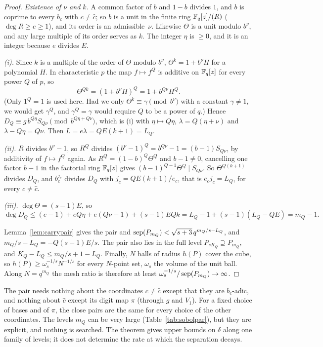 \begin{proof}
\emph{Existence of $\nu$ and $k$.} A common factor of $b$ and $1-b$ divides $1$, and $b$ is coprime to every $b_c$ with $c\ne\hat c$; so $b$ is a unit in the finite ring $\mathbb{F}_q[z]/(R)$ ($\deg R\ge e\ge1$), and its order is an admissible~$\nu$. Likewise $\Theta$ is a unit modulo $b^\nu$, and any large multiple of its order serves as $k$. The integer $\eta$ is $\ge0$, and it is an integer because $e$ divides $E$.

\emph{(i).} Since $k$ is a multiple of the order of $\Theta$ modulo $b^\nu$, $\Theta^k=1+b^\nu H$ for a polynomial $H$. In characteristic $p$ the map $f\mapsto f^Q$ is additive on $\mathbb{F}_q[z]$ for every power $Q$ of $p$, so
\[
\Theta^{Qk}=(1+b^\nu H)^Q=1+b^{Q\nu}H^Q .
\]
(Only $1^Q=1$ is used here. Had we only $\Theta^k\equiv\gamma\pmod{b^\nu}$ with a constant $\gamma\ne1$, we would get $\gamma^Q$, and $\gamma^Q=\gamma$ would require $Q$ to be a power of $q$.) Hence $D_Q\equiv g\,b^{Q\eta}S_{Q\nu}\pmod{b^{Q\eta+Q\nu}}$, which is (i) with $\eta\mapsto Q\eta$, $\lambda=Q(\eta+\nu)$ and $\lambda-Q\eta=Q\nu$. Then $L=e\lambda=QE(k+1)=L_Q$.

\emph{(ii).} $R$ divides $b^\nu-1$, so $R^Q$ divides $(b^\nu-1)^Q=b^{Q\nu}-1=(b-1)S_{Q\nu}$, by additivity of $f\mapsto f^Q$ again. As $R^Q=(1-b)^Q\Theta^Q$ and $b-1\ne0$, cancelling one factor $b-1$ in the factorial ring $\mathbb{F}_q[z]$ gives $(b-1)^{Q-1}\Theta^Q\mid S_{Q\nu}$. So $\Theta^{Q(k+1)}$ divides $D_Q$, and $b_c^{j_c}$ divides $D_Q$ with $j_c=QE(k+1)/e_c$, that is $e_cj_c=L_Q$, for every $c\ne\hat c$.

\emph{(iii).} $\deg\Theta=(s-1)E$, so
\[
\deg D_Q\le(e-1)+eQ\eta+e(Q\nu-1)+(s-1)EQk=L_Q-1+(s-1)(L_Q-QE)=m_Q-1 .
\]

Lemma~\ref{lem:carrypair} gives the pair and $\operatorname{sep}(P_{m_Q})<\sqrt{s+3}\,q^{m_Q/s-L_Q}$, and $m_Q/s-L_Q=-Q(s-1)E/s$. The pair also lies in the full level $P_{sK_Q}\supseteq P_{m_Q}$, and $K_Q-L_Q\le m_Q/s+1-L_Q$. Finally, $N$ balls of radius $h(P)$ cover the cube, so $h(P)\ge\omega_s^{-1/s}N^{-1/s}$ for every $N$-point set, $\omega_s$ the volume of the unit ball. Along $N=q^{m_Q}$ the mesh ratio is therefore at least $\omega_s^{-1/s}/\operatorname{sep}(P_{m_Q})\to\infty$.
\end{proof}

The pair needs nothing about the coordinates $c\ne\hat c$ except that they are $b_c$-adic, and nothing about $\hat c$ except its digit map $\pi$ (through $g$ and $V_1$). For a fixed choice of bases and of $\pi$, the close pairs are the same for every choice of the other coordinates. The levels $m_Q$ can be very large (Table~\ref{tab:sobolpar}), but they are explicit, and nothing is searched. The theorem gives upper bounds on $\delta$ along one family of levels; it does not determine the rate at which the separation decays.

